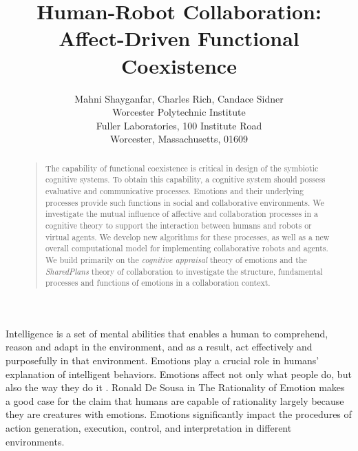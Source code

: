 \documentclass[letterpaper]{article}
\begin{document}
%
\title{Human-Robot Collaboration: Affect-Driven Functional Coexistence}
\author{Mahni Shayganfar, Charles Rich, Candace Sidner\\
Worcester Polytechnic Institute\\
Fuller Laboratories, 100 Institute Road\\
Worcester, Massachusetts, 01609\\
}
\maketitle
\begin{abstract}
\begin{quote}
The capability of functional coexistence is critical in design of the symbiotic
cognitive systems. To obtain this capability, a cognitive system should possess
evaluative and communicative processes. Emotions and their underlying processes
provide such functions in social and collaborative environments. We investigate
the mutual influence of affective and collaboration processes in a cognitive
theory to support the interaction between humans and robots or virtual agents.
We develop new algorithms for these processes, as well as a new overall
computational model for implementing collaborative robots and agents. We build
primarily on the \textit{cognitive appraisal} theory of emotions and the
\textit{SharedPlans} theory of collaboration to investigate the structure,
fundamental processes and functions of emotions in a collaboration context.
\end{quote}
\end{abstract}

Intelligence is a set of mental abilities that enables a human to comprehend,
reason and adapt in the environment, and as a result, act effectively and
purposefully in that environment. Emotions play a crucial role in humans'
explanation of intelligent behaviors. Emotions affect not only what people do,
but also the way they do it \cite{cowie:concepts-definitions}. Ronald De Sousa
in The Rationality of Emotion \cite{sousa:rationality-emotion} makes a good case
for the claim that humans are capable of rationality largely because they are
creatures with emotions. Emotions significantly impact the procedures of action
generation, execution, control, and interpretation \cite{zhu:emotion-action} in
different environments. 
\end{document}
